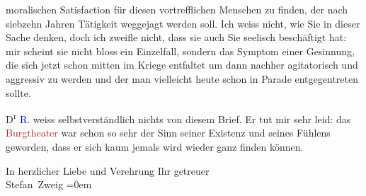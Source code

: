               moralischen Satisfaction für diesen vortrefflichen {\pb}Menschen zu finden, der nach siebzehn
               Jahren Tätigkeit \label{K_L03653-4v}\label{K_L03653-4h}
               weggejagt werden soll. Ich weiss nicht, wie Sie in dieser Sache denken, doch ich
               zweifle nicht, dass sie auch Sie seelisch beschäftigt hat: mir scheint sie nicht
               bloss ein Einzelfall, sondern das Symptom einer Gesinnung, die sich jetzt schon
               mitten im Kriege entfaltet um dann nachher agitatorisch und aggressiv zu werden und
               der man vielleicht heute schon in Parade entgegentreten sollte.\pend
           
\pstart
           D\textsuperscript{r}{ }\textcolor{blue}{R.}{}\ledrightnote{\textcolor{blue}{Richard Rosenbaum}} weiss selbstverständlich nichts von diesem
               Brief. Er tut mir sehr leid: das \textcolor{brown}{Burgtheater}{}\ledrightnote{\textcolor{brown}{Burgtheater}} war
               schon so sehr der Sinn seiner Existenz und seines Fühlens geworden, dass er sich kaum
               jemals wird wieder ganz finden können.\pend
           
\pstart
           In herzlicher Liebe und Verehrung Ihr getreuer{\\[\baselineskip]}\spacefill\mbox{Stefan Zweig}\pend
           \leftskip=0em{}\endnumbering{}
\begin{anhang}
\end{anhang}
      